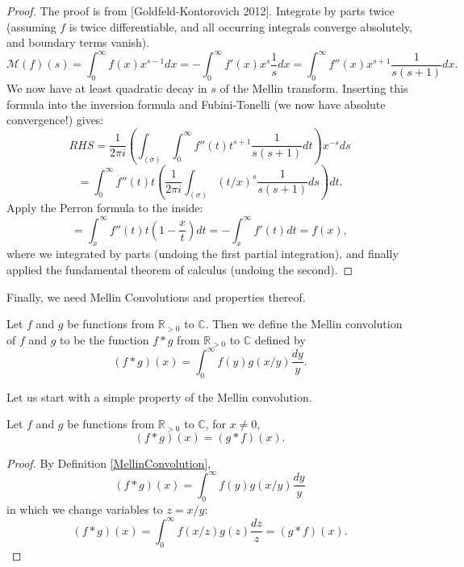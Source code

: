 \begin{proof}\leanok
{}
The proof is from [Goldfeld-Kontorovich 2012].
Integrate by parts twice (assuming $f$ is twice differentiable, and all occurring
integrals converge absolutely, and
boundary terms vanish).
$$
\mathcal{M}(f)(s) = \int_0^\infty f(x)x^{s-1}dx = - \int_0^\infty f'(x)x^s\frac{1}{s}dx
= \int_0^\infty f''(x)x^{s+1}\frac{1}{s(s+1)}dx.
$$
We now have at least quadratic decay in $s$ of the Mellin transform. Inserting this
formula into the inversion formula and Fubini-Tonelli (we now have absolute
convergence!) gives:
$$
RHS = \frac{1}{2\pi i}\left(\int_{(\sigma)}\int_0^\infty
  f''(t)t^{s+1}\frac{1}{s(s+1)}dt\right) x^{-s}ds
$$
$$
= \int_0^\infty f''(t) t \left( \frac{1}{2\pi i}
\int_{(\sigma)}(t/x)^s\frac{1}{s(s+1)}ds\right) dt.
$$
Apply the Perron formula to the inside:
$$
= \int_x^\infty f''(t) t \left(1-\frac{x}{t}\right)dt
= -\int_x^\infty f'(t) dt
= f(x),
$$
where we integrated by parts (undoing the first partial integration), and finally
applied the fundamental theorem of calculus (undoing the second).
\end{proof}


Finally, we need Mellin Convolutions and properties thereof.
\begin{definition}[MellinConvolution]\label{MellinConvolution}
\leanok
Let $f$ and $g$ be functions from $\mathbb{R}_{>0}$ to $\mathbb{C}$. Then we define the
Mellin convolution of $f$ and $g$ to be the function $f\ast g$ from $\mathbb{R}_{>0}$
to $\mathbb{C}$ defined by
$$(f\ast g)(x) = \int_0^\infty f(y)g(x/y)\frac{dy}{y}.$$
\end{definition}


Let us start with a simple property of the Mellin convolution.
\begin{lemma}[MellinConvolutionSymmetric]\label{MellinConvolutionSymmetric}
\leanok
Let $f$ and $g$ be functions from $\mathbb{R}_{>0}$ to $\mathbb{C}$, for $x\neq0$,
$$
  (f\ast g)(x)=(g\ast f)(x)
  .
$$
\end{lemma}


\begin{proof}
  By Definition \ref{MellinConvolution},
  $$
    (f\ast g)(x) = \int_0^\infty f(y)g(x/y)\frac{dy}{y}
  $$
  in which we change variables to $z=x/y$:
  $$
    (f\ast g)(x) = \int_0^\infty f(x/z)g(z)\frac{dz}{z}
    =(g\ast f)(x)
    .
  $$
\end{proof}


